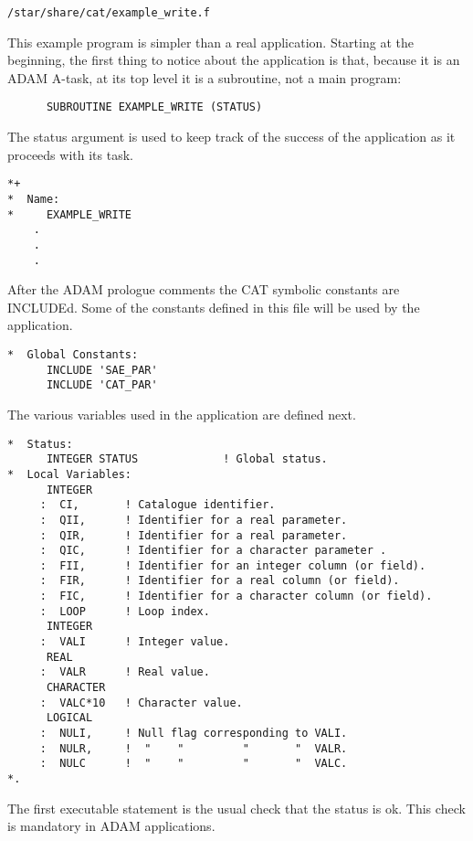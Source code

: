 \begin{center}
{\tt /star/share/cat/example\_write.f}
\end{center}

This example program is simpler than a real application. Starting at the
beginning, the first thing to notice about the application is that,
because it is an ADAM A-task, at its top level it is a subroutine, not
a main program:

\begin{verbatim}
      SUBROUTINE EXAMPLE_WRITE (STATUS)
\end{verbatim}

The status argument is used to keep track of the success of the
application as it proceeds with its task.

\begin{verbatim}
*+
*  Name:
*     EXAMPLE_WRITE
    .
    .
    .
\end{verbatim}

After the ADAM prologue comments the CAT symbolic constants are
INCLUDEd. Some of the constants defined in this file will be used by
the application.

\begin{verbatim}
*  Global Constants:
      INCLUDE 'SAE_PAR'
      INCLUDE 'CAT_PAR'
\end{verbatim}

The various variables used in the application are defined next.

\begin{verbatim}
*  Status:
      INTEGER STATUS             ! Global status.
*  Local Variables:
      INTEGER
     :  CI,       ! Catalogue identifier.
     :  QII,      ! Identifier for a real parameter.
     :  QIR,      ! Identifier for a real parameter.
     :  QIC,      ! Identifier for a character parameter .
     :  FII,      ! Identifier for an integer column (or field).
     :  FIR,      ! Identifier for a real column (or field).
     :  FIC,      ! Identifier for a character column (or field).
     :  LOOP      ! Loop index.
      INTEGER
     :  VALI      ! Integer value.
      REAL
     :  VALR      ! Real value.
      CHARACTER
     :  VALC*10   ! Character value.
      LOGICAL
     :  NULI,     ! Null flag corresponding to VALI.
     :  NULR,     !  "    "         "       "  VALR.
     :  NULC      !  "    "         "       "  VALC.
*.
\end{verbatim}

The first executable statement is the usual check that the status is ok.
This check is mandatory in ADAM applications.

